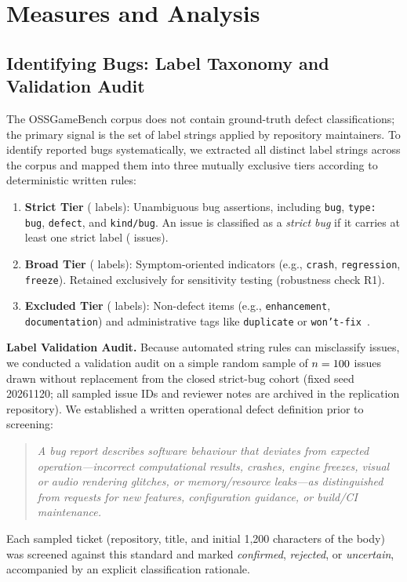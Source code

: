\section{Measures and Analysis}\label{sec:method}

\subsection{Identifying Bugs: Label Taxonomy and Validation Audit}\label{sec:labels}
The OSSGameBench corpus does not contain ground-truth defect classifications; the primary signal is the set of label strings applied by repository maintainers. To identify reported bugs systematically, we extracted all \vallabelsTotal{} distinct label strings across the corpus and mapped them into three mutually exclusive tiers according to deterministic written rules:
\begin{enumerate}
  \item \textbf{Strict Tier} (\vallabelsStrict{} labels): Unambiguous bug assertions, including \texttt{bug}, \texttt{type: bug}, \texttt{defect}, and \texttt{kind/bug}. An issue is classified as a \emph{strict bug} if it carries at least one strict label (\valSone{} issues).
  \item \textbf{Broad Tier} (\vallabelsBroad{} labels): Symptom-oriented indicators (e.g., \texttt{crash}, \texttt{regression}, \texttt{freeze}). Retained exclusively for sensitivity testing (robustness check R1).
  \item \textbf{Excluded Tier} (\vallabelsExcl{} labels): Non-defect items (e.g., \texttt{enhancement}, \texttt{documentation}) and administrative tags like \texttt{duplicate} or \texttt{won't-fix}~\cite{herzig2013not}.
\end{enumerate}

\textbf{Label Validation Audit.} Because automated string rules can misclassify issues, we conducted a validation audit on a simple random sample of $n=100$ issues drawn without replacement from the closed strict-bug cohort (fixed seed 20261120; all sampled issue IDs and reviewer notes are archived in the replication repository). We established a written operational defect definition prior to screening:
\begin{quote}
\emph{A bug report describes software behaviour that deviates from expected operation—incorrect computational results, crashes, engine freezes, visual or audio rendering glitches, or memory/resource leaks—as distinguished from requests for new features, configuration guidance, or build/CI maintenance.}
\end{quote}
Each sampled ticket (repository, title, and initial 1{,}200 characters of the body) was screened against this standard and marked \emph{confirmed}, \emph{rejected}, or \emph{uncertain}, accompanied by an explicit classification rationale.

